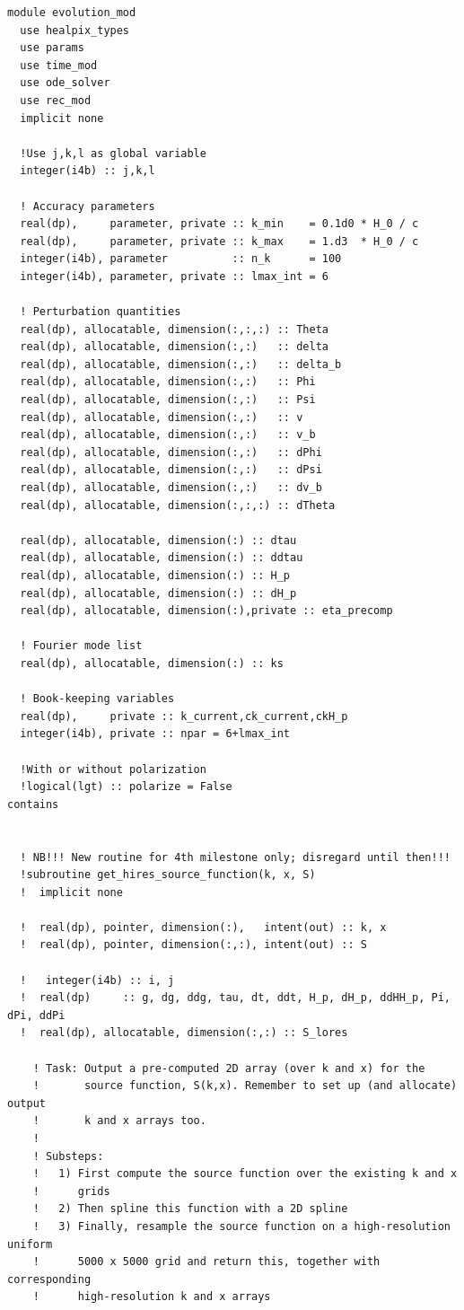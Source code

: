 \documentclass[a4paper]{report}
\begin{document}
\begin{verbatim}
module evolution_mod
  use healpix_types
  use params
  use time_mod
  use ode_solver
  use rec_mod
  implicit none

  !Use j,k,l as global variable
  integer(i4b) :: j,k,l

  ! Accuracy parameters
  real(dp),     parameter, private :: k_min    = 0.1d0 * H_0 / c
  real(dp),     parameter, private :: k_max    = 1.d3  * H_0 / c
  integer(i4b), parameter          :: n_k      = 100
  integer(i4b), parameter, private :: lmax_int = 6

  ! Perturbation quantities
  real(dp), allocatable, dimension(:,:,:) :: Theta
  real(dp), allocatable, dimension(:,:)   :: delta
  real(dp), allocatable, dimension(:,:)   :: delta_b
  real(dp), allocatable, dimension(:,:)   :: Phi
  real(dp), allocatable, dimension(:,:)   :: Psi
  real(dp), allocatable, dimension(:,:)   :: v
  real(dp), allocatable, dimension(:,:)   :: v_b
  real(dp), allocatable, dimension(:,:)   :: dPhi
  real(dp), allocatable, dimension(:,:)   :: dPsi
  real(dp), allocatable, dimension(:,:)   :: dv_b
  real(dp), allocatable, dimension(:,:,:) :: dTheta

  real(dp), allocatable, dimension(:) :: dtau
  real(dp), allocatable, dimension(:) :: ddtau
  real(dp), allocatable, dimension(:) :: H_p
  real(dp), allocatable, dimension(:) :: dH_p
  real(dp), allocatable, dimension(:),private :: eta_precomp

  ! Fourier mode list
  real(dp), allocatable, dimension(:) :: ks

  ! Book-keeping variables
  real(dp),     private :: k_current,ck_current,ckH_p
  integer(i4b), private :: npar = 6+lmax_int

  !With or without polarization
  !logical(lgt) :: polarize = False
contains


  ! NB!!! New routine for 4th milestone only; disregard until then!!!
  !subroutine get_hires_source_function(k, x, S)
  !  implicit none

  !  real(dp), pointer, dimension(:),   intent(out) :: k, x
  !  real(dp), pointer, dimension(:,:), intent(out) :: S

  !   integer(i4b) :: i, j
  !  real(dp)     :: g, dg, ddg, tau, dt, ddt, H_p, dH_p, ddHH_p, Pi, dPi, ddPi
  !  real(dp), allocatable, dimension(:,:) :: S_lores

    ! Task: Output a pre-computed 2D array (over k and x) for the 
    !       source function, S(k,x). Remember to set up (and allocate) output 
    !       k and x arrays too. 
    !
    ! Substeps:
    !   1) First compute the source function over the existing k and x
    !      grids
    !   2) Then spline this function with a 2D spline
    !   3) Finally, resample the source function on a high-resolution uniform
    !      5000 x 5000 grid and return this, together with corresponding
    !      high-resolution k and x arrays


\end{verbatim}
\end{document}
